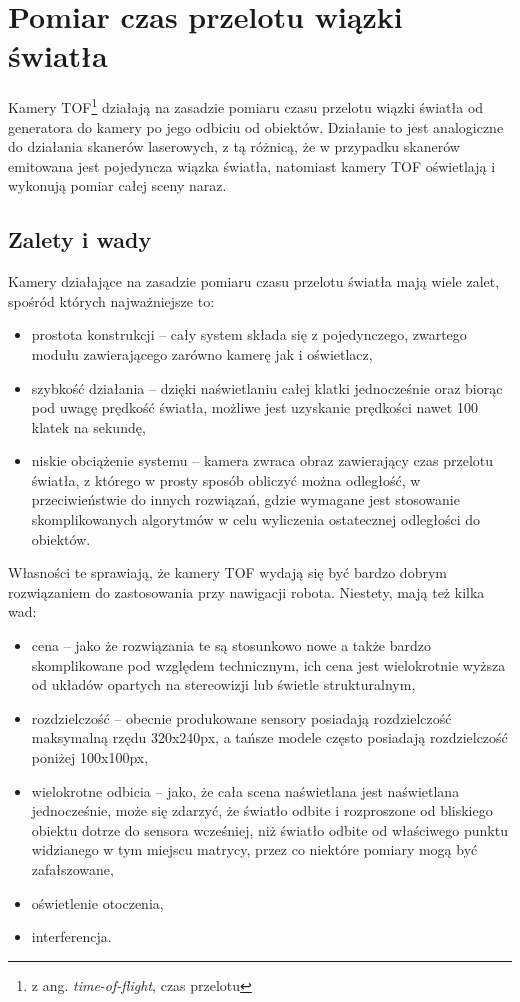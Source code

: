 \section{Pomiar czas przelotu wiązki światła}

Kamery TOF\footnote{z ang. {\it time-of-flight}, czas przelotu} działają na zasadzie
pomiaru czasu przelotu wiązki światła od generatora do kamery po jego odbiciu od
obiektów. Działanie to jest analogiczne do działania skanerów laserowych, z tą różnicą,
że w przypadku skanerów emitowana jest pojedyncza wiązka światła, natomiast kamery TOF
oświetlają i wykonują pomiar całej sceny naraz.

\subsection{Zalety i wady}

Kamery działające na zasadzie pomiaru czasu przelotu światła mają wiele zalet, spośród
których najważniejsze to:

\begin{itemize}
\item prostota konstrukcji -- cały system składa się z pojedynczego, zwartego
modułu zawierającego zarówno kamerę jak i oświetlacz,
\item szybkość działania -- dzięki naświetlaniu całej klatki jednocześnie oraz
biorąc pod uwagę prędkość światła, możliwe jest uzyskanie prędkości nawet 100 klatek
na sekundę,
\item niskie obciążenie systemu -- kamera zwraca obraz zawierający czas przelotu
światła, z którego w prosty sposób obliczyć można odległość, w przeciwieństwie do
innych rozwiązań, gdzie wymagane jest stosowanie skomplikowanych algorytmów w celu
wyliczenia ostatecznej odległości do obiektów.
\end{itemize}

Własności te sprawiają, że kamery TOF wydają się być bardzo dobrym rozwiązaniem
do zastosowania przy nawigacji robota. Niestety, mają też kilka wad:

\begin{itemize}
\item cena -- jako że rozwiązania te są stosunkowo nowe a także bardzo skomplikowane
pod względem technicznym, ich cena jest wielokrotnie wyższa od układów opartych na
stereowizji lub świetle strukturalnym,
\item rozdzielczość -- obecnie produkowane sensory posiadają rozdzielczość maksymalną
rzędu 320x240px, a tańsze modele często posiadają rozdzielczość poniżej 100x100px,
\item wielokrotne odbicia -- jako, że cała scena naświetlana jest naświetlana jednocześnie,
może się zdarzyć, że światło odbite i rozproszone od bliskiego obiektu dotrze do
sensora wcześniej, niż światło odbite od właściwego punktu widzianego w tym miejscu
matrycy, przez co niektóre pomiary mogą być zafałszowane,
\item oświetlenie otoczenia,
\item interferencja.
\end{itemize}

